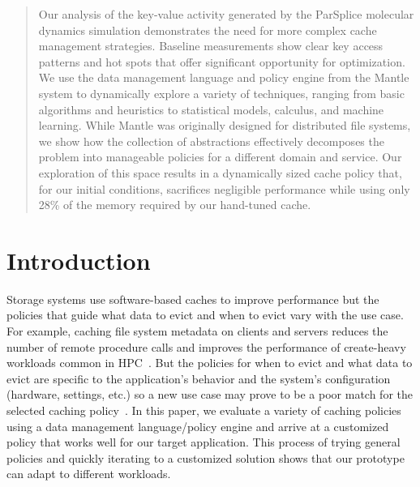 \begin{abstract}

Our analysis of the key-value activity generated by the ParSplice molecular
dynamics simulation demonstrates the need for more complex cache management
strategies. Baseline measurements show clear key access patterns and hot spots
that offer significant opportunity for optimization. We use the data management
language and policy engine from the Mantle system to dynamically explore a
variety of techniques, ranging from basic algorithms and heuristics to
statistical models, calculus, and machine learning. While Mantle was originally
designed for distributed file systems, we show how the collection of
abstractions effectively decomposes the problem into manageable policies for a
different domain and service.  Our exploration of this space results in a
dynamically sized cache policy that, for our initial conditions, sacrifices
negligible performance while using only 28\% of the memory required by our
hand-tuned cache.

\end{abstract}

\section{Introduction}

Storage systems use software-based caches to improve performance but the
policies that guide what data to evict and when to evict vary with the use
case. For example, caching file system metadata on clients and servers reduces
the number of remote procedure calls and improves the performance of
create-heavy workloads common in HPC~\cite{ren:sc2014-indexfs,
patil:fast2011-giga+}. But the policies for when to evict and what data to
evict are specific to the application's behavior and the system's configuration
(hardware, settings, etc.) so a new use case may prove to be a poor match for
the selected caching
policy~\cite{xiao:socc15-shardfs,brandt:msst2003-lh,sevilla:sc15-mantle,
weil:sc2004-dyn-metadata, weil:osdi2006-ceph}. In this paper, we evaluate a
variety of caching policies using a data management language/policy engine and
arrive at a customized policy that works well for our target application.  This
process of trying general policies and quickly iterating to a customized
solution shows that our prototype can adapt to different workloads.


